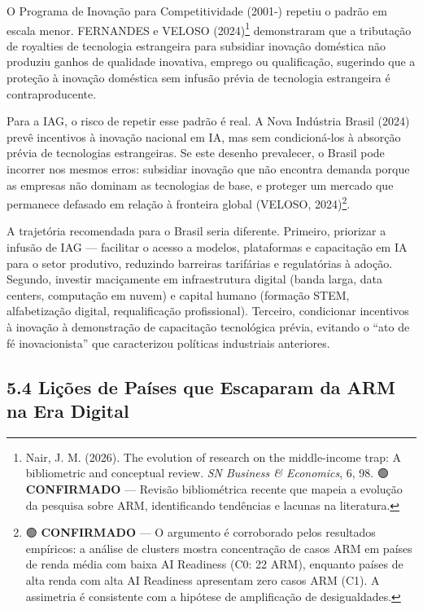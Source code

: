 \documentclass[
  brazilian,
  12pt,
]{article}
\begin{document}
O Programa de Inovação para Competitividade (2001-) repetiu o padrão em escala menor. FERNANDES e VELOSO (2024)\footnote{Nair, J. M. (2026). The evolution of research on the middle-income trap: A bibliometric and conceptual review. \emph{SN Business \& Economics}, 6, 98. 🟢 \textbf{CONFIRMADO} --- Revisão bibliométrica recente que mapeia a evolução da pesquisa sobre ARM, identificando tendências e lacunas na literatura.} demonstraram que a tributação de royalties de tecnologia estrangeira para subsidiar inovação doméstica não produziu ganhos de qualidade inovativa, emprego ou qualificação, sugerindo que a proteção à inovação doméstica sem infusão prévia de tecnologia estrangeira é contraproducente.

Para a IAG, o risco de repetir esse padrão é real. A Nova Indústria Brasil (2024) prevê incentivos à inovação nacional em IA, mas sem condicioná-los à absorção prévia de tecnologias estrangeiras. Se este desenho prevalecer, o Brasil pode incorrer nos mesmos erros: subsidiar inovação que não encontra demanda porque as empresas não dominam as tecnologias de base, e proteger um mercado que permanece defasado em relação à fronteira global (VELOSO, 2024)\footnote{🟢 \textbf{CONFIRMADO} --- O argumento é corroborado pelos resultados empíricos: a análise de clusters mostra concentração de casos ARM em países de renda média com baixa AI Readiness (C0: 22 ARM), enquanto países de alta renda com alta AI Readiness apresentam zero casos ARM (C1). A assimetria é consistente com a hipótese de amplificação de desigualdades.}.

A trajetória recomendada para o Brasil seria diferente. Primeiro, priorizar a infusão de IAG --- facilitar o acesso a modelos, plataformas e capacitação em IA para o setor produtivo, reduzindo barreiras tarifárias e regulatórias à adoção. Segundo, investir maciçamente em infraestrutura digital (banda larga, data centers, computação em nuvem) e capital humano (formação STEM, alfabetização digital, requalificação profissional). Terceiro, condicionar incentivos à inovação à demonstração de capacitação tecnológica prévia, evitando o ``ato de fé inovacionista'' que caracterizou políticas industriais anteriores.

\subsection{5.4 Lições de Países que Escaparam da ARM na Era Digital}\label{liuxe7uxf5es-de-pauxedses-que-escaparam-da-arm-na-era-digital}
\end{document}
